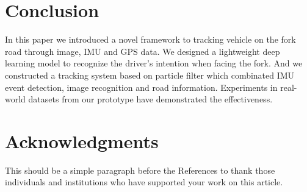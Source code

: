 \documentclass[journal]{IEEEtran}
\begin{document}
\section{Conclusion}
In this paper we introduced a novel framework to tracking vehicle on the fork road through image, IMU and GPS data. We designed a lightweight deep learning model to recognize the driver's intention when facing the fork. And we constructed a tracking system based on particle filter which combinated IMU event detection, image recognition and road information. 
Experiments in real-world datasets from our prototype have demonstrated the effectiveness.

\section*{Acknowledgments}
This should be a simple paragraph before the References to thank those individuals and institutions who have supported your work on this article.









 
\end{document}
